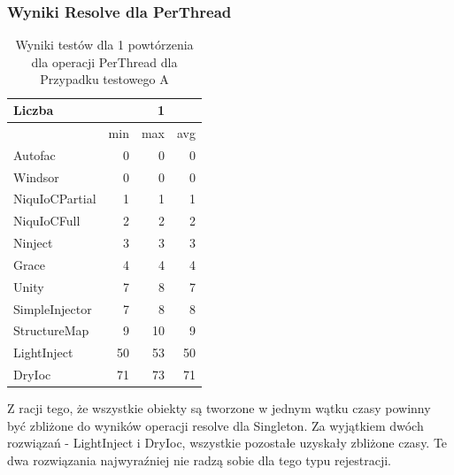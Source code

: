 \documentclass[12pt]{article}
\begin{document}
\subsubsection{Wyniki Resolve dla PerThread}
\begin{table}[H]
\captionsetup{belowskip=0pt,aboveskip=0pt}
\begin{center}
\begin{small}
	\begin{tabular}{ | l | r r r | }
    		\hline
Liczba & & 1 & \\ \hline
 & min & max & avg \\ \hline
Autofac & 0 & 0 & 0 \\ \hline
Windsor & 0 & 0 & 0 \\ \hline
NiquIoCPartial & 1 & 1 & 1 \\ \hline
NiquIoCFull & 2 & 2 & 2 \\ \hline
Ninject & 3 & 3 & 3 \\ \hline
Grace & 4 & 4 & 4 \\ \hline
Unity & 7 & 8 & 7 \\ \hline
SimpleInjector & 7 & 8 & 8 \\ \hline
StructureMap & 9 & 10 & 9 \\ \hline
LightInject & 50 & 53 & 50 \\ \hline
DryIoc & 71 & 73 & 71 \\ \hline
  	\end{tabular}
\end{small}
\end{center}
\caption{Wyniki testów dla 1 powtórzenia dla operacji PerThread dla Przypadku testowego A}
\label{TestCaseA_PerThread1}
\end{table}
Z racji tego, że wszystkie obiekty są tworzone w jednym wątku czasy powinny być zbliżone do wyników operacji resolve dla Singleton. Za wyjątkiem dwóch rozwiązań - LightInject i DryIoc, wszystkie pozostałe uzyskały zbliżone czasy. Te dwa rozwiązania najwyraźniej nie radzą sobie dla tego typu rejestracji.
\\ \\
\end{document}

